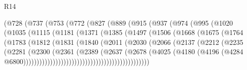 \begin{lexlean}{R14}
\begin{coremodule}
                (@728
                  (@737
                    (@753
                      (@772
                        (@827
                          (@889
                            (@915
                              (@937
                                (@974
                                  (@995
                                    (@1020
                                      (@1035
                                        (@1115
                                          (@1181
                                            (@1371
                                              (@1385
                                                (@1497
                                                  (@1506
                                                    (@1668
                                                      (@1675
                                                        (@1764
                                                          (@1783
                                                            (@1812
                                                              (@1831
                                                                (@1840
                                                                  (@2011
                                                                    (@2030
                                                                      (@2066
                                                                        (@2137
                                                                          (@2212
                                                                            (@2235
                                                                              (@2281
                                                                                (@2300
                                                                                  (@2361
                                                                                    (@2389
                                                                                      (@2637
                                                                                        (@2678
                                                                                          (@4025
                                                                                            (@4180
                                                                                              (@4196
                                                                                                (@4284
                                                                                                  @6800)))))))))))))))))))))))))))))))))))))))))))))))

\end{coremodule}
\end{lexlean}
